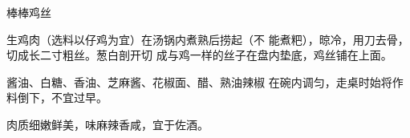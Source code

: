 \begin{recipe}{棒棒鸡丝}

\ingredients


\cooking

\step 	生鸡肉（选料以仔鸡为宜）在汤锅内煮熟后捞起（不 能煮粑），晾冷，用刀去骨，切成长二寸粗丝。葱白剖开切 成与鸡一样的丝子在盘内垫底，鸡丝铺在上面。

\step 	酱油、白糖、香油、芝麻酱、花椒面、醋、熟油辣椒 在碗内调匀，走桌时始将作料倒下，不宜过早。

\notes

肉质细嫩鲜美，味麻辣香咸，宜于佐酒。

\end{recipe}

